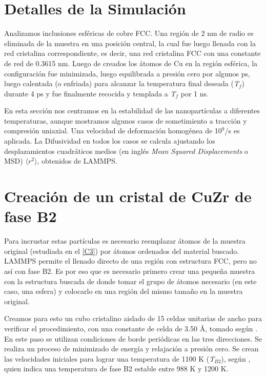 
\section{Detalles de la Simulación}
\label{S4_1}

Analizamos inclusiones esféricas de cobre FCC. Una región de 2 nm de radio es eliminada de la muestra en una posición central, la cual fue luego llenada con la red cristalina correspondiente, es decir, una red cristalina FCC con una constante de red de 0.3615 nm. Luego de creados los átomos de Cu en la región esférica, la configuración fue minimizada, luego equilibrada a presión cero por algunos ps, luego calentada (o enfriada) para alcanzar la temperatura final deseada (\textit{T$_{f}$}) durante 4 ps y fue finalmente recocida y templada a \textit{T$_{f}$} por 1 ns.

En esta sección nos centramos en la estabilidad de las nanopartículas a diferentes temperaturas, aunque mostramos algunos casos de sometimiento a tracción y compresión uniaxial. Una velocidad de deformación homogénea de 10$^{9}$/s es aplicada. La Difusividad en todos los casos se calcula ajustando los desplazamientos cuadráticos medios (en inglés \textit{Mean Squared Displacements} o MSD) $\langle r^{2}\rangle$, obtenidos de LAMMPS.

\section{Creación de un cristal de CuZr de fase B2}
\label{S4_2}

Para incrustar estas partículas es necesario reemplazar átomos de la muestra original (estudiada en el \cref{C3}) por átomos ordenados del material buscado. LAMMPS permite el llenado directo de una región con estructura FCC, pero no así con fase B2. Es por eso que es necesario  primero crear una pequeña muestra con la estructura buscada de donde tomar el grupo de átomos necesario (en este caso, una esfera) y colocarlo en una región del mismo tamaño en la muestra original.

Creamos para esto un cubo cristalino aislado de 15 celdas unitarias de ancho para verificar el procedimiento, con una constante de celda de 3.50 \AA{}, tomado según \cite{inoue04}. En este paso se utilizan condiciones de borde periódicas en las tres direcciones. Se realiza un proceso de minimizado de energía y relajación a presión cero. Se crean las velocidades iniciales para lograr una temperatura de 1100 K (\textit{T$_{B2}$}), según \cite{pauly10}, quien indica una temperatura de fase B2 estable entre 988 K y 1200 K. 

